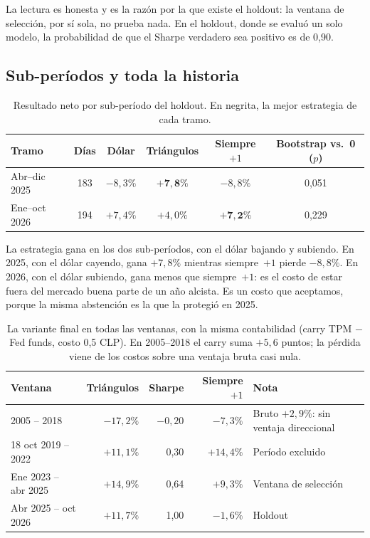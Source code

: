 \documentclass[10pt,a4paper]{article}
\begin{document}
La lectura es honesta y es la razón por la que existe el holdout: la ventana de
selección, por sí sola, no prueba nada. En el holdout, donde se evaluó un solo modelo, la
probabilidad de que el Sharpe verdadero sea positivo es de 0,90.

\subsection{Sub-períodos y toda la historia}\label{sec:rob_periodos}

\begin{table}[htb]\centering\small
\begin{tabular}{@{}lccccc@{}}
\toprule
Tramo & Días & Dólar & Triángulos & Siempre $+1$ & Bootstrap vs.\ 0 ($p$) \\
\midrule
Abr--dic 2025 & 183 & $-8{,}3\%$ & $\mathbf{+7{,}8\%}$ & $-8{,}8\%$ & 0{,}051 \\
Ene--oct 2026 & 194 & $+7{,}4\%$   & $+4{,}0\%$ & $\mathbf{+7{,}2\%}$ & 0{,}229 \\
\bottomrule
\end{tabular}
\caption{Resultado neto por sub-período del holdout. En negrita, la mejor estrategia de
cada tramo.}\label{tab:subperiodos}
\end{table}

La estrategia gana en los dos sub-períodos, con el dólar bajando y subiendo. En 2025,
con el dólar cayendo, gana $+7{,}8\%$ mientras siempre~$+1$ pierde $-8{,}8\%$. En 2026,
con el dólar subiendo, gana menos que siempre~$+1$: es el costo de estar fuera del
mercado buena parte de un año alcista. Es un costo que aceptamos, porque la misma
abstención es la que la protegió en 2025.

\begin{table}[htb]\centering\small
\begin{tabular}{@{}lrrrl@{}}
\toprule
Ventana & Triángulos & Sharpe & Siempre $+1$ & Nota \\
\midrule
2005 -- 2018            & $-17{,}2\%$ & $-0{,}20$ & $-7{,}3\%$  & Bruto $+2{,}9\%$: sin ventaja direccional \\
18 oct 2019 -- 2022     & $+11{,}1\%$ & 0,30      & $+14{,}4\%$ & Período excluido \\
Ene 2023 -- abr 2025    & $+14{,}9\%$ & 0,64      & $+9{,}3\%$  & Ventana de selección \\
Abr 2025 -- oct 2026    & $+11{,}7\%$ & 1,00      & $-1{,}6\%$  & Holdout \\
\bottomrule
\end{tabular}
\caption{La variante final en todas las ventanas, con la misma contabilidad (carry TPM
$-$ Fed funds, costo 0,5 CLP). En 2005--2018 el carry suma $+5{,}6$ puntos; la pérdida
viene de los costos sobre una ventaja bruta casi nula.}\label{tab:todas}
\end{table}
\end{document}
